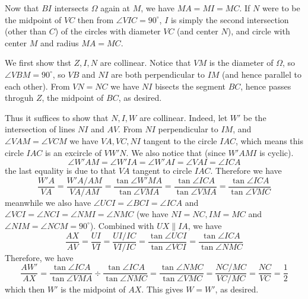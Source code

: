 \documentclass[11pt,a4paper]{article}
\begin{document}
\begin{enumerate}
	Now that $BI$ intersects $\Omega$ again at $M$, we have $MA=MI=MC$. If $N$ were to be the midpoint of $VC$ then from $\angle VIC=90^{\circ}$, $I$ is simply the second intersection (other than $C$) of the circles with diameter $VC$ (and center $N$), and circle with center $M$ and radius $MA=MC$. 
	
	We first show thst $Z, I, N$ are collinear. Notice that $VM$ is the diameter of $\Omega$, so $\angle VBM=90^{\circ}$, so $VB$ and $NI$ are both perpendicular to $IM$ (and hence parallel to each other). 
	From $VN=NC$ we have $NI$ bisects the segment $BC$, hence passes throguh $Z$, the midpoint of $BC$, as desired. 
	
	Thus it suffices to show that $N, I, W$ are collinear. Indeed, let $W'$ be the intersection of lines $NI$ and $AV$. From $NI$ perpendicular to $IM$, and $\angle VAM=\angle VCM$ we have $VA, VC, NI$ tangent to the circle $IAC$, which means this circle $IAC$ is an excircle of $VW'N$. We also notice that (since $W'AMI$ is cyclic). 
	\[
	\angle W'AM = \angle W'IA=\angle W'AI=\angle VAI = \angle ICA
	\]
	the last equality is due to that $VA$ tangent to circle $IAC$. Therefore we have 
	\[
	\frac{W'A}{VA}=\frac{W'A/AM}{VA/AM}=\frac{\tan\angle W'MA}{\tan\angle VMA}=\frac{\tan\angle ICA}{\tan\angle VMA}=\frac{\tan\angle ICA}{\tan\angle VMC}
	\]
	meanwhile we also have $\angle UCI=\angle BCI=\angle ICA$ and $\angle VCI=\angle NCI=\angle NMI=\angle NMC$ (we have $NI=NC, IM=MC$ and $\angle NIM=\angle NCM=90^{\circ}$). 
	Combined with $UX\parallel IA$, we have 
	\[
	\frac{AX}{AV}=\frac{UI}{VI}=\frac{UI/IC}{VI/IC} = \frac{\tan\angle UCI}{\tan\angle VCI} = \frac{\tan\angle ICA}{\tan\angle NMC}
	\]
	Therefore, we have 
	\[
	\frac{AW'}{AX}=\frac{\tan\angle ICA}{\tan\angle VMA}\div \frac{\tan\angle ICA}{\tan\angle NMC} = \frac{\tan\angle NMC}{\tan\angle VMC}=\frac{NC/MC}{VC/MC}=\frac{NC}{VC}=\frac 12
	\]
	which then $W'$ is the midpoint of $AX$. This gives $W=W'$, as desired. 
	
\end{enumerate}
\end{document}
